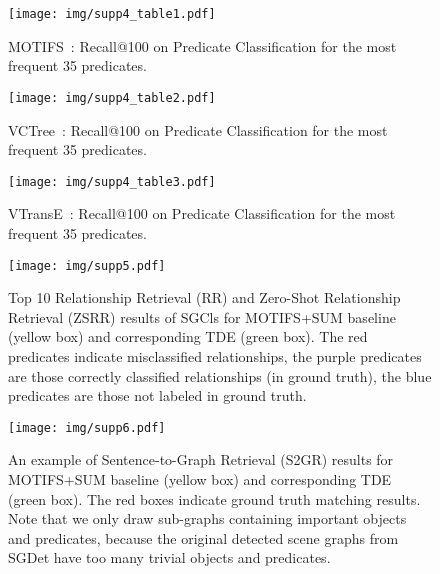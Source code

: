 \documentclass[10pt,twocolumn,letterpaper]{article}
\begin{document}
\begin{figure}
   \begin{minipage}[b]{1\linewidth}
   \centerline{\texttt{[image: img/supp4\_table1.pdf]}}
   \end{minipage}
   \caption{MOTIFS\textsuperscript{}~\cite{zellers2018neural}: Recall@100 on Predicate Classification for the most frequent 35 predicates.}
   \label{supp_fig:q1} \end{figure}

\begin{figure}
   \begin{minipage}[b]{1\linewidth}
   \centerline{\texttt{[image: img/supp4\_table2.pdf]}}
   \end{minipage}
   \caption{VCTree\textsuperscript{}~\cite{tang2019learning}: Recall@100 on Predicate Classification for the most frequent 35 predicates.}
   \label{supp_fig:q2} \end{figure}

\begin{figure}
   \begin{minipage}[b]{1\linewidth}
   \centerline{\texttt{[image: img/supp4\_table3.pdf]}}
   \end{minipage}
   \caption{VTransE\textsuperscript{}~\cite{zhang2017visual}: Recall@100 on Predicate Classification for the most frequent 35 predicates.}
   \label{supp_fig:q3} \end{figure}



\begin{figure*}
   \begin{minipage}[b]{1\linewidth}
   \centerline{\texttt{[image: img/supp5.pdf]}}
   \end{minipage}
   \caption{Top 10 Relationship Retrieval (RR) and Zero-Shot Relationship Retrieval (ZSRR) results of SGCls for MOTIFS\textsuperscript{}+SUM baseline (yellow box) and corresponding TDE (green box). The red predicates indicate misclassified relationships, the purple predicates are those correctly classified relationships (in ground truth), the blue predicates are those not labeled in ground truth.}
   \label{supp_fig:5} \end{figure*}

\begin{figure*}
   \begin{minipage}[b]{1\linewidth}
   \centerline{\texttt{[image: img/supp6.pdf]}}
   \end{minipage}
   \caption{An example of Sentence-to-Graph Retrieval (S2GR) results for MOTIFS\textsuperscript{}+SUM baseline (yellow box) and corresponding TDE (green box). The red boxes indicate ground truth matching results. Note that we only draw sub-graphs containing important objects and predicates, because the original detected scene graphs from SGDet have too many trivial objects and predicates.}
   \label{supp_fig:6} \end{figure*}
\end{document}
